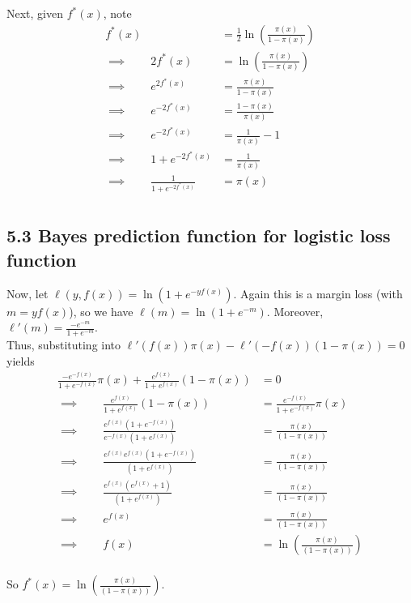 \documentclass[paper=a4, fontsize=11pt]{scrartcl} %
\numberwithin{equation}{section} %
\numberwithin{figure}{section} %
\numberwithin{table}{section} %
\begin{document}
Next, given $f^*(x)$, note
\begin{align*}
f^*(x) &= \frac{1}{2} \ln \left(\frac{\pi(x)}{1 - \pi(x)}\right) \\
\implies \qquad{} 2f^*(x) &= \ln \left(\frac{\pi(x)}{1 - \pi(x)}\right) \\
\implies \qquad{} e^{2f^*(x)} &= \frac{\pi(x)}{1 - \pi(x)} \\
\implies \qquad{} e^{-2f^*(x)} &= \frac{1 - \pi(x)}{\pi(x)} \\
\implies \qquad{} e^{-2f^*(x)} &= \frac{1}{\pi(x)} - 1\\
\implies \qquad{} 1 + e^{-2f^*(x)} &= \frac{1}{\pi(x)} \\
\implies \qquad{} \frac{1}{1 + e^{-2f^*(x)}} &= \pi(x) \\
\end{align*}

\subsection*{5.3 Bayes prediction function for logistic loss function}

Now, let $\ell(y, f(x)) = \ln(1 + e^{-y f(x)})$. Again this is a margin loss (with $m = yf(x)$), so we have
$\ell(m) =  \ln(1 + e^{-m})$. Moreover, $\ell'(m) = \frac{-e^{-m}}{1 + e^{-m}}$.\\

Thus, substituting into $\ell'(f(x))\pi(x) - \ell'(-f(x))(1- \pi(x)) = 0$ yields
\begin{align*}
\frac{-e^{-f(x)}}{1 + e^{-f(x)}}\pi(x) + \frac{e^{f(x)}}{1 + e^{f(x)}}(1- \pi(x)) &= 0 \\
\implies \qquad{} \frac{e^{f(x)}}{1 + e^{f(x)}}(1- \pi(x)) &= \frac{e^{-f(x)}}{1 + e^{-f(x)}}\pi(x)\\
\implies \qquad{} \frac{e^{f(x)}(1 + e^{-f(x)})}{e^{-f(x)}(1 + e^{f(x)})} &= \frac{\pi(x)}{(1- \pi(x))}\\
\implies \qquad{} \frac{e^{f(x)}e^{f(x)}(1 + e^{-f(x)})}{(1 + e^{f(x)})} &= \frac{\pi(x)}{(1- \pi(x))}\\
\implies \qquad{} \frac{e^{f(x)}(e^{f(x)} + 1)}{(1 + e^{f(x)})} &= \frac{\pi(x)}{(1- \pi(x))}\\
\implies \qquad{} e^{f(x)}&= \frac{\pi(x)}{(1- \pi(x))}\\
\implies \qquad{} f(x)&= \ln\left(\frac{\pi(x)}{(1- \pi(x))}\right)\\
\end{align*}

So $f^*(x) =\ln\left(\frac{\pi(x)}{(1- \pi(x))}\right)$.\\
\end{document}
